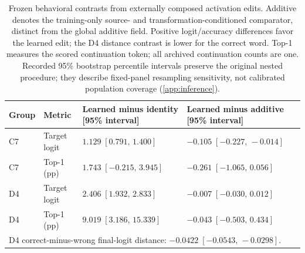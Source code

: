 \begin{table}[t]
\caption{Frozen behavioral contrasts from externally composed activation edits. Additive denotes the training-only source- and transformation-conditioned comparator, distinct from the global additive field. Positive logit/accuracy differences favor the learned edit; the D4 distance contrast is lower for the correct word. Top-1 measures the scored continuation token; all archived continuation counts are one. Recorded 95\% bootstrap percentile intervals preserve the original nested procedure; they describe fixed-panel resampling sensitivity, not calibrated population coverage (\cref{app:inference}).}
\label{tab:causal-main}
\centering
\small
\begin{tabular}{llll}
\toprule
Group & Metric & Learned minus identity [95\% interval] & Learned minus additive [95\% interval] \\
\midrule
C7 & Target logit & $1.129\;[0.791,\,1.400]$ & $-0.105\;[-0.227,\,-0.014]$ \\
C7 & Top-1 (pp) & $1.743\;[-0.215,\,3.945]$ & $-0.261\;[-1.065,\,0.056]$ \\
D4 & Target logit & $2.406\;[1.932,\,2.833]$ & $-0.007\;[-0.030,\,0.012]$ \\
D4 & Top-1 (pp) & $9.019\;[3.186,\,15.339]$ & $-0.043\;[-0.503,\,0.434]$ \\
\midrule
\multicolumn{4}{l}{D4 correct-minus-wrong final-logit distance: $-0.0422\;[-0.0543,\,-0.0298]$.} \\
\bottomrule
\end{tabular}
\end{table}
